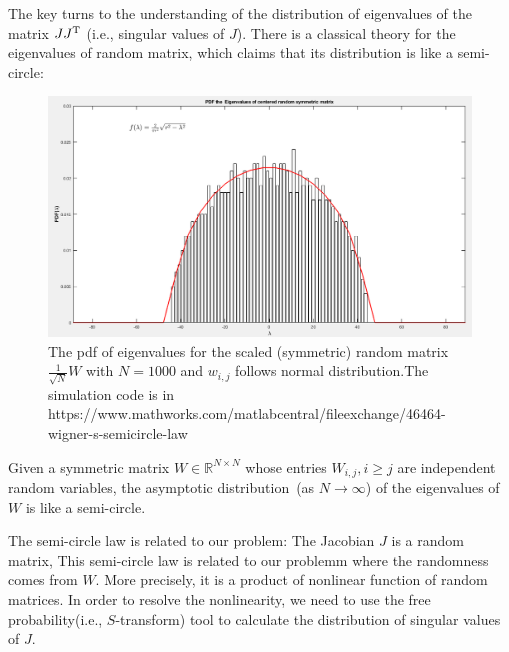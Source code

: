 The key turns to the understanding of the distribution of eigenvalues of the matrix $JJ^{\mathrm T}$ (i.e., singular values of $J$).
There is a classical theory for the eigenvalues of random matrix, which claims that its distribution is like a semi-circle:
\begin{figure}[H]
\centering
\includegraphics[height=0.4\textwidth]{Forth_lecture/f_3}
\caption{
The pdf of eigenvalues for the scaled (symmetric) random matrix $\frac{1}{\sqrt{N}}W$ with $N=1000$ and $w_{i,j}$ follows normal distribution.{The simulation code is in 
{{https://www.mathworks.com/matlabcentral/fileexchange/46464-wigner-s-semicircle-law}}}
}
\end{figure}
\begin{theorem}
Given a symmetric matrix $W\in\mathbb{R}^{N\times N}$ whose entries $W_{i,j},i\ge j$ are independent random variables, the asymptotic distribution~(as $N\to\infty$) of the eigenvalues of $W$ is like a semi-circle.
\end{theorem}

The semi-circle law is related to our problem:
The Jacobian $J$ is a random matrix, 
This semi-circle law is related to our problemm where the randomness comes from $W$.
More precisely, it is a product of nonlinear function of random matrices.
In order to resolve the nonlinearity, we need to use the free probability(i.e., $S$-transform) tool to calculate the distribution of singular values of $J$.

